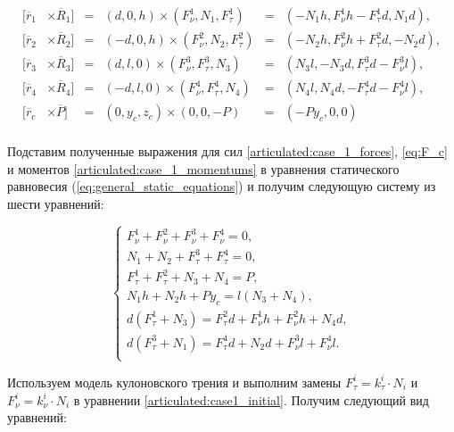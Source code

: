 \begin{equation}
\label{articulated:case_1_momentums}
  \begin{alignedat}{3}
    [\overline{r}_1&\times\overline{R}_1] &=&  (d,0,h)\times(F_\nu^1, N_1, F_\tau^1) &=& (-N_1h,F_\nu^1h - F_\tau^1d,N_1d),  \\
    [\overline{r}_2&\times\overline{R}_2] &=& (-d,0,h)\times(F_\nu^2, N_2, F_\tau^2) &=& (-N_2h,F_\nu^2h + F_\tau^2d,-N_2d), \\
    [\overline{r}_3&\times\overline{R}_3] &=&  (d,l,0)\times(F_\nu^3, F_\tau^3, N_3) &=& (N_3l,-N_3d, F_\tau^3d-F_\nu^3l), \\
    [\overline{r}_4&\times\overline{R}_4] &=& (-d,l,0)\times(F_\nu^4, F_\tau^4, N_4) &=& (N_4l, N_4d,-F_\tau^4d-F_\nu^4l),\\
    [\overline{r}_c&\times\overline{P}]   &=&  (0, y_c, z_c)\times(0,0,-P) &=& (-Py_c,0,0)\\
  \end{alignedat}
\end{equation}

Подставим полученные выражения для сил \ref{articulated:case_1_forces}, \ref{eq:F_c} и моментов \ref{articulated:case_1_momentums} в уравнения статического равновесия (\ref{eq:general_static_equations}) и получим следующую систему из шести уравнений:

\begin{equation}
  \label{articulated:case1_initial}
  \left\{
    \begin{alignedat}{3}  
      F_\nu^1 + F_\nu^2 + F_\nu^3 + F_\nu^4 = 0, \\
      N_1 + N_2 + F_\tau^3 + F_\tau^4 = 0, \\
      F_\tau^1 + F_\tau^2 + N_3 + N_4 = P, \\
      N_1h + N_2h + Py_c = l(N_3 + N_4), \\
      d(F_\tau^1 + N_3) = F_\tau^2d + F_\nu^1h + F_\nu^2h + N_4d, \\
      d(F_\tau^3 + N_1) = F_\tau^4d + N_2d +F_\nu^3l + F_\nu^4l.\\
    \end{alignedat}
  \right.
\end{equation}

Используем модель кулоновского трения и выполним замены $F_\tau^i = k_\tau^i\cdot N_i$ и $F_\nu^i = k_\nu^i\cdot N_i$ в уравнении \ref{articulated:case1_initial}. Получим следующий вид уравнений:

